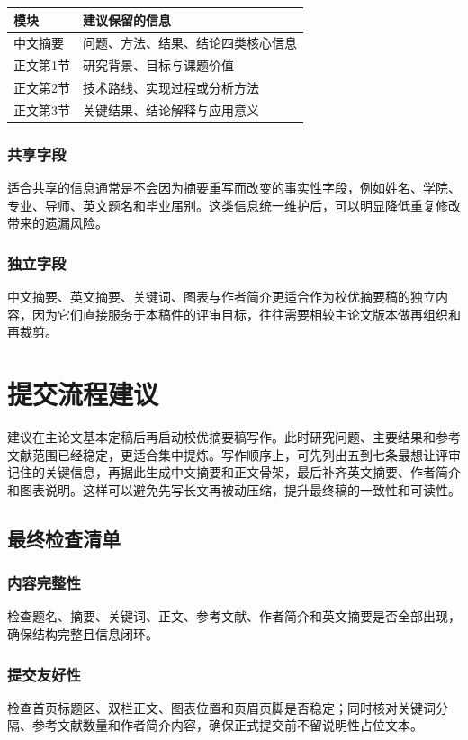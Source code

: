 \begin{center}
    \label{tab:excellent-outline}
    \begin{tabular}{p{}p{}}
        \toprule
        模块 & 建议保留的信息 \\
        \midrule
        中文摘要 & 问题、方法、结果、结论四类核心信息 \\
        正文第1节 & 研究背景、目标与课题价值 \\
        正文第2节 & 技术路线、实现过程或分析方法 \\
        正文第3节 & 关键结果、结论解释与应用意义 \\
        \bottomrule
    \end{tabular}
\end{center}

\subsubsection{共享字段}
适合共享的信息通常是不会因为摘要重写而改变的事实性字段，例如姓名、学院、专业、导师、英文题名和毕业届别。这类信息统一维护后，可以明显降低重复修改带来的遗漏风险。

\subsubsection{独立字段}
中文摘要、英文摘要、关键词、图表与作者简介更适合作为校优摘要稿的独立内容，因为它们直接服务于本稿件的评审目标，往往需要相较主论文版本做再组织和再裁剪。

\section{提交流程建议}

建议在主论文基本定稿后再启动校优摘要稿写作。此时研究问题、主要结果和参考文献范围已经稳定，更适合集中提炼。写作顺序上，可先列出五到七条最想让评审记住的关键信息，再据此生成中文摘要和正文骨架，最后补齐英文摘要、作者简介和图表说明。这样可以避免先写长文再被动压缩，提升最终稿的一致性和可读性。

\subsection{最终检查清单}

\subsubsection{内容完整性}
检查题名、摘要、关键词、正文、参考文献、作者简介和英文摘要是否全部出现，确保结构完整且信息闭环。

\subsubsection{提交友好性}
检查首页标题区、双栏正文、图表位置和页眉页脚是否稳定；同时核对关键词分隔、参考文献数量和作者简介内容，确保正式提交前不留说明性占位文本。
